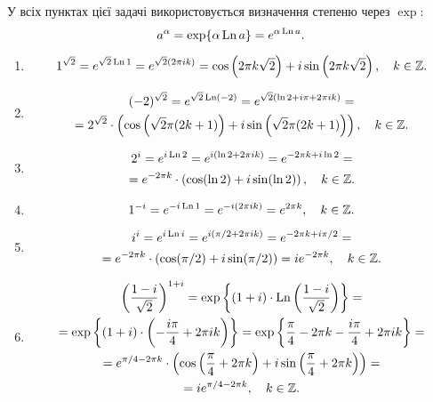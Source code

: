 \begin{solution}
	У всіх пунктах цієї задачі використовується визначення степеню через $\exp$:
	\begin{equation}
		\label{eq:1.4.1}
		a^\alpha = \exp\{\alpha \operatorname{Ln} a\} = e^{\alpha \operatorname{Ln} a}.
	\end{equation}
	\begin{enumerate}
		\item \[ 1^{\sqrt{2}} = e^{\sqrt{2} \operatorname{Ln} 1} = e^{\sqrt{2} (2 \pi i k)} = \cos \left(2\pi k\sqrt{2}\right) + i \sin \left(2\pi k\sqrt{2}\right), \quad k \in \mathbb{Z}.\]
		\item \begin{multline*} 
			(-2)^{\sqrt{2}} = e^{\sqrt{2} \operatorname{Ln} (-2)} = e^{\sqrt{2} (\ln 2 + i \pi + 2 \pi i k)} = \\
			= 2^{\sqrt{2}} \cdot \left(\cos \left(\sqrt{2}\pi (2k+1)\right) + i \sin \left(\sqrt{2} \pi (2k+1)\right)\right), \quad k \in \mathbb{Z}.
		\end{multline*}
		\item \begin{multline*} 
			2^i = e^{i \operatorname{Ln} 2} = e^{i (\ln 2 + 2\pi i k)} = e^{-2 \pi k + i \ln 2} = \\
			= e^{-2 \pi k} \cdot \left( \cos (\ln 2) + i \sin (\ln 2) \right), \quad k \in \mathbb{Z}.
		\end{multline*}
		\item \[ 1^{-i} = e^{-i \operatorname{Ln} 1} = e^{-i (2 \pi i k)} = e^{2 \pi k}, \quad k \in \mathbb{Z}.\]
		\item \begin{multline*} 
			i^i = e^{i \operatorname{Ln} i} = e^{i (\pi / 2 + 2 \pi i k)} = e^{- 2 \pi k + i \pi / 2} = \\
			= e^{-2 \pi k} \cdot (\cos (\pi / 2) + i \sin (\pi / 2)) = i e^{-2 \pi k}, \quad k \in \mathbb{Z}.
		\end{multline*}
		\item \begin{multline*}
			\left( \frac{1-i}{\sqrt{2}} \right)^{1+i} = \exp\left\{ (1 + i) \cdot \Ln\left( \frac{1 - i}{\sqrt{2}} \right) \right\} = \\
			= \exp\left\{ (1 + i) \cdot \left( - \frac{i \pi}{4} + 2 \pi i k \right) \right\} =  \exp\left\{ \frac\pi4 - 2 \pi k - \frac{i \pi}4 + 2 \pi i k \right\} = \\
			= e^{\pi/4 - 2 \pi k} \cdot \left(\cos\left(\frac\pi4 + 2 \pi k\right) + i \sin \left(\frac\pi4 + 2 \pi k\right)\right) = \\
			= i e^{\pi / 4 - 2 \pi k}, \quad k \in \mathbb{Z}.

\end{multline*}
\end{enumerate}
\end{solution}
